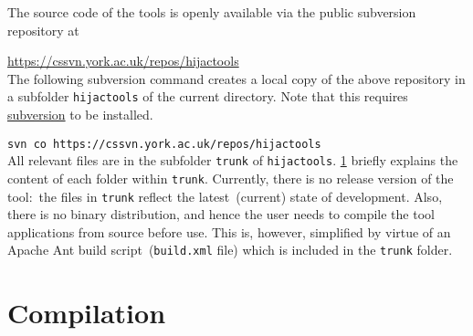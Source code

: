 \documentclass{report}
\begin{document}
The source code of the {\hiJAC} tools is openly available via the public subversion repository at\vspace{0.5em}
%
\par\url{https://cssvn.york.ac.uk/repos/hijactools}\\[+0.5em]
%
The following subversion command creates a local copy of the above repository in a subfolder \verb"hijactools" of the current directory. Note that this requires \href{https://subversion.apache.org/}{subversion} to be installed.\vspace{0.5em}
%
\par\indent \verb"svn co https://cssvn.york.ac.uk/repos/hijactools"\\[+0.5em]
%
All relevant files are in the subfolder \verb"trunk" of \verb"hijactools". \figname\ref{} briefly explains the content of each folder within \verb"trunk". Currently, there is no release version of the tool:~the files in \verb"trunk" reflect the latest~(current) state of development. Also, there is no binary distribution, and hence the user needs to compile the tool applications from source before use. This is, however, simplified by virtue of an Apache Ant build script~(\verb"build.xml" file)  which is included in the \verb"trunk" folder.

\section{Compilation}
\end{document}
